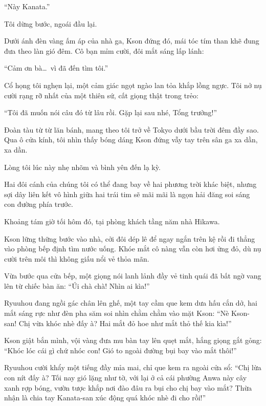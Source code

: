 \documentclass[../main.tex]{subfiles}
\begin{document}
``Này Kanata.''

Tôi dừng bước, ngoái đầu lại.

Dưới ánh đèn vàng ấm áp của nhà ga, Kson đứng đó, mái tóc tím than khẽ đung đưa theo làn gió đêm. Cô bạn mỉm cười, đôi mắt sáng lấp lánh:

``Cảm ơn bà\dots\ vì đã đến tìm tôi.''

Cổ họng tôi nghẹn lại, một cảm giác ngọt ngào lan tỏa khắp lồng ngực. Tôi nở nụ cười rạng rỡ nhất của một thiên sứ, cất giọng thật trong trẻo:

``Tôi đã muốn nói câu đó từ lâu rồi. Gặp lại sau nhé, Tổng trưởng!''

Đoàn tàu từ từ lăn bánh, mang theo tôi trở về Tokyo dưới bầu trời đêm đầy sao. Qua ô cửa kính, tôi nhìn thấy bóng dáng Kson đứng vẫy tay trên sân ga xa dần, xa dần.

Lòng tôi lúc này nhẹ nhõm và bình yên đến lạ kỳ.

Hai đôi cánh của chúng tôi có thể đang bay về hai phương trời khác biệt, nhưng sợi dây liên kết vô hình giữa hai trái tim sẽ mãi mãi là ngọn hải đăng soi sáng con đường phía trước.

\omk

\pov{-}

Khoảng tám giờ tối hôm đó, tại phòng khách tầng năm nhà Hikawa.

Kson lững thững bước vào nhà, cởi đôi dép lê để ngay ngắn trên kệ rồi đi thẳng vào phòng bếp định tìm nước uống. Khóe mắt cô nàng vẫn còn hơi ửng đỏ, dù nụ cười trên môi thì không giấu nổi vẻ thỏa mãn.

Vừa bước qua cửa bếp, một giọng nói lanh lảnh đầy vẻ tinh quái đã bất ngờ vang lên từ chiếc bàn ăn: ``Úi chà chà! Nhìn ai kìa!''

Ryuuhou đang ngồi gác chân lên ghế, một tay cầm que kem dưa hấu cắn dở, hai mắt sáng rực như đèn pha săm soi nhìn chằm chằm vào mặt Kson: ``Nè Kson-san! Chị vừa khóc nhè đấy à? Hai mắt đỏ hoe như mắt thỏ thế kia kìa!''

Kson giật bắn mình, vội vàng đưa mu bàn tay lên quẹt mắt, hắng giọng gắt gỏng: ``Khóc lóc cái gì chứ nhóc con! Gió to ngoài đường bụi bay vào mắt thôi!''

Ryuuhou cười khẩy một tiếng đầy mỉa mai, chỉ que kem ra ngoài cửa sổ: ``Chị lừa con nít đấy à? Tối nay gió lặng như tờ, với lại ở cả cái phường Anwa này cây xanh rợp bóng, vườn tược khắp nơi đào đâu ra bụi cho chị bay vào mắt? Thừa nhận là chia tay Kanata-san xúc động quá khóc nhè đi cho rồi!''
\end{document}
